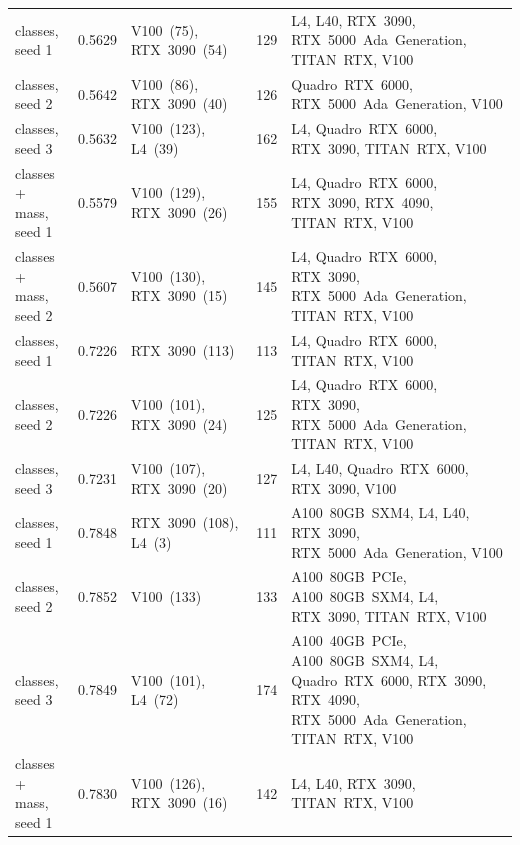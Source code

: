 \documentclass[12pt]{article}   %
\newcommand{\Kres}{\VocabSizeLonesixtwo}
\newcommand{\Kmid}{\VocabSizeRfourtwoQone}
\newcommand{\Kcoarse}{\VocabSizeRonesixQone}
\begin{document}
\begin{landscape}
{\begin{longtable}{@{\extracolsep{\fill}}lc>{\raggedright\arraybackslash}p{5.4cm}r>{\raggedright\arraybackslash}p{6.9cm}@{}}
\Kres{} classes, seed 1 & 0.5629 & \mbox{V100 (75)}, \mbox{RTX 3090 (54)} & 129 & \mbox{L4}, \mbox{L40}, \mbox{RTX 3090}, \mbox{RTX 5000 Ada Generation}, \mbox{TITAN RTX}, \mbox{V100} \\
\Kres{} classes, seed 2 & 0.5642 & \mbox{V100 (86)}, \mbox{RTX 3090 (40)} & 126 & \mbox{Quadro RTX 6000}, \mbox{RTX 5000 Ada Generation}, \mbox{V100} \\
\Kres{} classes, seed 3 & 0.5632 & \mbox{V100 (123)}, \mbox{L4 (39)} & 162 & \mbox{L4}, \mbox{Quadro RTX 6000}, \mbox{RTX 3090}, \mbox{TITAN RTX}, \mbox{V100} \\
\Kres{} classes + mass, seed 1 & 0.5579 & \mbox{V100 (129)}, \mbox{RTX 3090 (26)} & 155 & \mbox{L4}, \mbox{Quadro RTX 6000}, \mbox{RTX 3090}, \mbox{RTX 4090}, \mbox{TITAN RTX}, \mbox{V100} \\
\Kres{} classes + mass, seed 2 & 0.5607 & \mbox{V100 (130)}, \mbox{RTX 3090 (15)} & 145 & \mbox{L4}, \mbox{Quadro RTX 6000}, \mbox{RTX 3090}, \mbox{RTX 5000 Ada Generation}, \mbox{TITAN RTX}, \mbox{V100} \\
\Kmid{} classes, seed 1 & 0.7226 & \mbox{RTX 3090 (113)} & 113 & \mbox{L4}, \mbox{Quadro RTX 6000}, \mbox{TITAN RTX}, \mbox{V100} \\
\Kmid{} classes, seed 2 & 0.7226 & \mbox{V100 (101)}, \mbox{RTX 3090 (24)} & 125 & \mbox{L4}, \mbox{Quadro RTX 6000}, \mbox{RTX 3090}, \mbox{RTX 5000 Ada Generation}, \mbox{TITAN RTX}, \mbox{V100} \\
\Kmid{} classes, seed 3 & 0.7231 & \mbox{V100 (107)}, \mbox{RTX 3090 (20)} & 127 & \mbox{L4}, \mbox{L40}, \mbox{Quadro RTX 6000}, \mbox{RTX 3090}, \mbox{V100} \\
\Kcoarse{} classes, seed 1 & 0.7848 & \mbox{RTX 3090 (108)}, \mbox{L4 (3)} & 111 & \mbox{A100 80GB SXM4}, \mbox{L4}, \mbox{L40}, \mbox{RTX 3090}, \mbox{RTX 5000 Ada Generation}, \mbox{V100} \\
\Kcoarse{} classes, seed 2 & 0.7852 & \mbox{V100 (133)} & 133 & \mbox{A100 80GB PCIe}, \mbox{A100 80GB SXM4}, \mbox{L4}, \mbox{RTX 3090}, \mbox{TITAN RTX}, \mbox{V100} \\
\Kcoarse{} classes, seed 3 & 0.7849 & \mbox{V100 (101)}, \mbox{L4 (72)} & 174 & \mbox{A100 40GB PCIe}, \mbox{A100 80GB SXM4}, \mbox{L4}, \mbox{Quadro RTX 6000}, \mbox{RTX 3090}, \mbox{RTX 4090}, \mbox{RTX 5000 Ada Generation}, \mbox{TITAN RTX}, \mbox{V100} \\
\Kcoarse{} classes + mass, seed 1 & 0.7830 & \mbox{V100 (126)}, \mbox{RTX 3090 (16)} & 142 & \mbox{L4}, \mbox{L40}, \mbox{RTX 3090}, \mbox{TITAN RTX}, \mbox{V100} \\

\end{longtable}}
\end{landscape}
\end{document}
